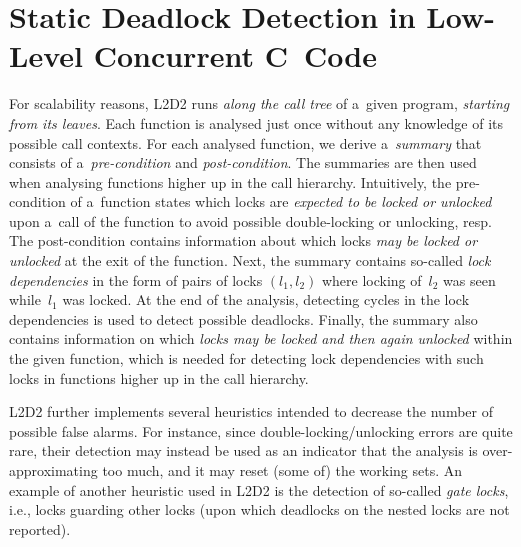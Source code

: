 \documentclass[runningheads]{llncs}
\begin{document}
\vspace*{-3.5mm}\section{Static Deadlock Detection in Low-Level Concurrent
C~Code}\vspace*{-2mm}

For scalability reasons, L2D2 runs \emph{along the call tree} of a~given
program, \emph{starting from its leaves}.
%
Each function is analysed just once without any knowledge of its possible call
contexts.
%
For each analysed function, we derive a~\emph{summary} that consists of
a~\emph{pre-condition} and \emph{post-condition}.
%
The summaries are then used when analysing functions higher up in the call
hierarchy.
%
%
%
Intuitively, the pre-condition of a~function states which locks are
\emph{expected to be locked or unlocked} upon a~call of the function to avoid
possible double-locking or unlocking, resp.
%
The post-condition contains information about which locks \emph{may be locked or
unlocked} at the exit of the function.
%
Next, the summary contains so-called \emph{lock dependencies} in the form of
pairs of locks $ (l_1, l_2) $ where locking of~$ l_2 $ was seen while~$ l_1 $
was locked.
%
At the end of the analysis, detecting cycles in the lock dependencies is used
to detect possible deadlocks.
%
Finally, the summary also contains information on which \emph{locks may be
locked and then again unlocked} within the given function, which is needed for
detecting lock dependencies with such locks in functions higher up in the call
hierarchy.

L2D2 further implements several heuristics intended to decrease the number
of possible false alarms.
%
For instance, since double-locking/unlocking errors are quite rare, their
detection may instead be used as an indicator that the analysis is
over-approximating too much, and it may reset (some of) the working sets.
%
An example of another heuristic used in L2D2 is the detection of so-called
\emph{gate locks}, i.e., locks guarding other locks (upon which deadlocks on the
nested locks are not reported).
\end{document}

